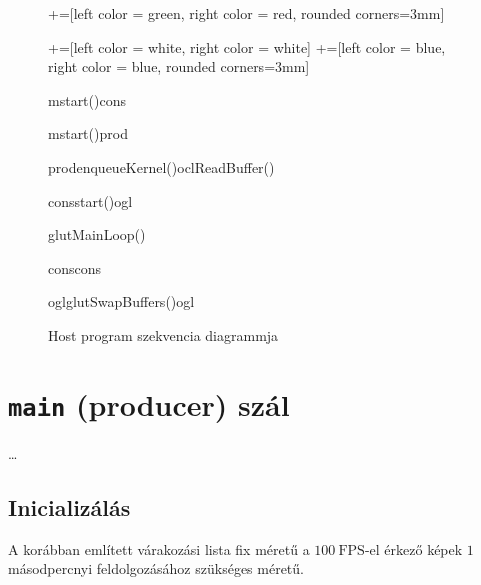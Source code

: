 \begin{figure}[!htp]
	
	\begin{sequencediagram}
	+=[left color = green, right color = red, rounded corners=3mm]
	
	+=[left color = white, right color = white]
	+=[left color = blue, right color = blue, rounded corners=3mm]
	
		\begin{call}{m}{start()}{cons}{}
		
		
		\begin{call}{m}{start()}{prod}{}
			\begin{call}{prod}{enqueueKernel()}{ocl}{ReadBuffer()}
			\end{call}
			
			\begin{messcall}{cons}{start()}{ogl}
			\begin{sdblock}{glutMainLoop()}{}
				\begin{call}{cons}{}{cons}{}
				\end{call}
			\end{sdblock}
			
			
			\begin{call}{ogl}{glutSwapBuffers()}{ogl}{}
			\end{call}
			\end{messcall}
					
		\end{call}
		
		
		\end{call}
	\end{sequencediagram}


  \caption{Host program szekvencia diagrammja}
  \label{fig:host_seq}  
\end{figure}


\section{\texttt{main} (producer) szál}
\dots
\subsection{Inicializálás}
A korábban említett várakozási lista fix méretű a $100\ \mathrm{FPS}$-el érkező képek $1$ másodpercnyi feldolgozásához szükséges
méretű.
